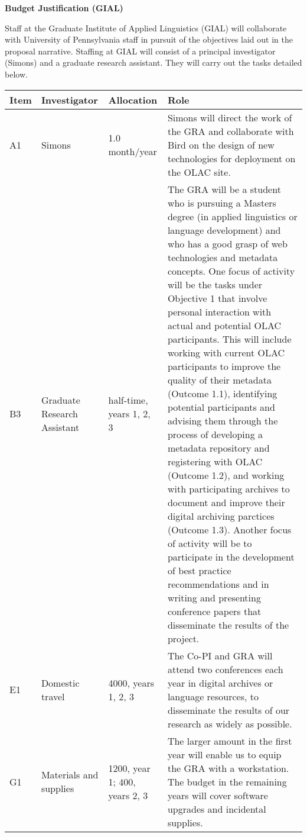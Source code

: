 \documentclass[11pt]{nsf}
\begin{document}
\begin{center}\textbf{\Large
Budget Justification (GIAL)
}\end{center}

Staff at the Graduate Institute of Applied Linguistics (GIAL) will
collaborate with University of Pennsylvania staff in pursuit of the
objectives laid out in the proposal narrative.
Staffing at GIAL will consist of a principal investigator (Simons)
and a graduate research assistant.  They will carry out the tasks
detailed below.

\vspace{1ex}

{\small\noindent
\begin{tabular}{lllp{3in}}
\textbf{Item} &
\textbf{Investigator} & \textbf{Allocation} & \textbf{Role} \\ \hline

A1 & Simons & 1.0 month/year &
Simons will direct the work of the GRA and collaborate with Bird
on the design of new technologies for deployment on the OLAC site.\\

B3 & Graduate Research Assistant & half-time, years 1, 2, 3 &
The GRA will be a student who is pursuing a Masters degree (in 
applied linguistics or language development) and who has a good grasp of web technologies and
metadata concepts. One focus of activity will be
the tasks under Objective 1 that involve personal interaction
with actual and potential OLAC participants.  This will include
working with current OLAC participants to improve the quality of their
metadata (Outcome 1.1), identifying potential participants and advising
them through the process of developing a metadata repository and registering with
OLAC (Outcome 1.2), and working with participating archives to document
and improve their digital archiving parctices (Outcome 1.3). 
Another focus of activity will be to participate
in the development of best practice recommendations and in
writing and presenting conference papers 
that disseminate the results of the project.\\

E1 & Domestic travel & 4000, years 1, 2, 3 &
The Co-PI and GRA will attend two conferences each year in digital archives or
language resources, to disseminate the results of our research as
widely as possible.\\

G1 & Materials and supplies & 1200, year 1; 400, years 2, 3 &
The larger amount in the first year will enable us
to equip the GRA with a workstation.  The budget in the remaining years
will cover software upgrades and incidental supplies.\\

\end{tabular}}
\end{document}

